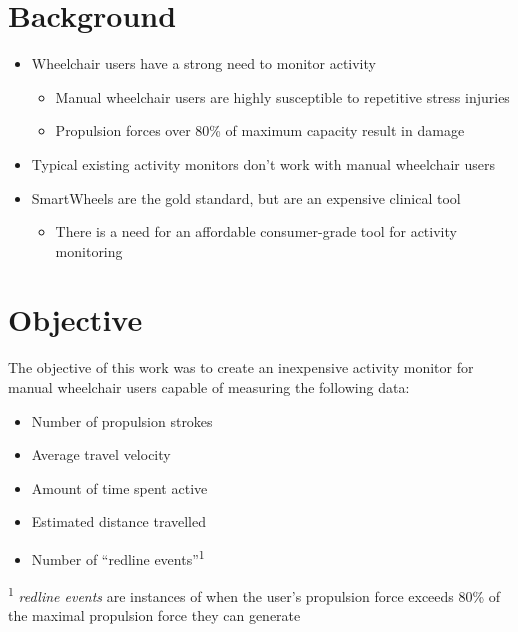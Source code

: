 \documentclass[a0,landscape]{a0poster}
\begin{document}
\vspace{4cm}

\begin{multicols*}{3}
\large

\section*{Background}
\begin{itemize}
    \item Wheelchair users have a strong need to monitor activity
        \begin{itemize}
            \item Manual wheelchair users are highly susceptible to repetitive stress injuries \cite{big}
            \item Propulsion forces over 80\% of maximum capacity result in damage \cite{small}
        \end{itemize}
    \item Typical existing activity monitors don't work with manual wheelchair users
    \item SmartWheels are the gold standard, but are an expensive clinical tool
        \begin{itemize}
            \item There is a need for an affordable consumer-grade tool for activity monitoring
        \end{itemize}
\end{itemize}

\section*{Objective}
The objective of this work was to create an inexpensive activity monitor for manual wheelchair users capable of measuring the following data:

\begin{itemize}
    \item Number of propulsion strokes
    \item Average travel velocity
    \item Amount of time spent active
    \item Estimated distance travelled
    \item Number of ``redline events''\textsuperscript{1}
\end{itemize}

\textsuperscript{1} \textit{redline events} are instances of when the user's propulsion force exceeds 80\% of the maximal propulsion force they can generate


\end{multicols*}
\end{document}
